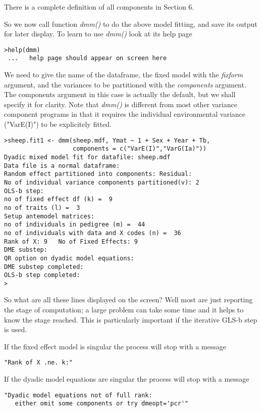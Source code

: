 \documentclass[titlepage]{article}  %
\begin{document}
There is a complete definition of all components in Section 6.

So we now call function {\em dmm()} to do the above model fitting, and save its output for later display. To learn to use {\em dmm()} look at its help page

\begin{verbatim}
>help(dmm)
 ...   help page should appear on screen here
\end{verbatim}

We need to give the name of the dataframe, the fixed model with the {\em fixform} argument, and the variances to be partitioned with the {\em components} argument. The components argument in this case is actually the default, but we shall specify it for clarity. Note that {\em dmm()} is different from most other variance component programs in that it requires the individual environmental variance ("VarE(I)") to be explicitely fitted.

\begin{verbatim}
>sheep.fit1 <- dmm(sheep.mdf, Ymat ~ 1 + Sex + Year + Tb,
                   components = c("VarE(I)","VarG(Ia)"))
Dyadic mixed model fit for datafile: sheep.mdf  
Data file is a normal dataframe:
Random effect partitioned into components: Residual:
No of individual variance components partitioned(v): 2 
OLS-b step:
no of fixed effect df (k) =  9 
no of traits (l) =  3 
Setup antemodel matrices:
no of individuals in pedigree (m) =  44 
no of individuals with data and X codes (n) =  36 
Rank of X: 9   No of Fixed Effects: 9 
DME substep:
QR option on dyadic model equations:
DME substep completed:
OLS-b step completed:
> 
\end{verbatim}

So what are all these lines displayed on the screen? Well most are just reporting the stage of computation; a large problem can take some time and it helps to know the stage reached. This is particularly important if the iterative GLS-b step is used.

 If the fixed effect model is singular the process will stop with a message
\begin{verbatim}
"Rank of X .ne. k:"
\end{verbatim}

If the dyadic model equations are singular the process will stop with a message
\begin{verbatim}
"Dyadic model equations not of full rank:
   either omit some components or try dmeopt='pcr'"
\end{verbatim}
\end{document}

